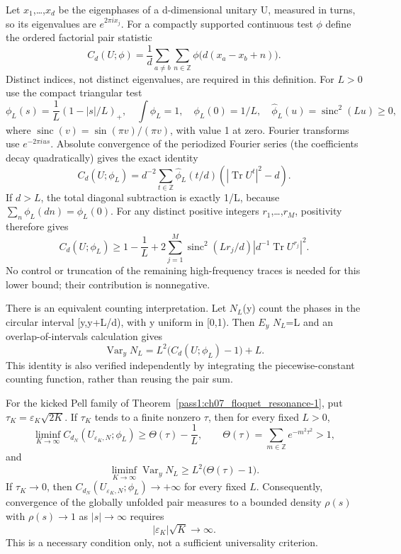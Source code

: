 Let \(x_{1}\),\ldots,\(x_{d}\) be the eigenphases of a d-dimensional unitary U, measured in turns, so its eigenvalues are \(e^{2\pi ix_j}\). For a compactly supported continuous test \(\phi\) define the ordered factorial pair statistic \[
 C_d(U;\phi)=\frac1d\sum_{a\ne b}\sum_{n\in\mathbb Z}
              \phi\bigl(d(x_a-x_b+n)\bigr).                    \tag{FN.23}
\] Distinct indices, not distinct eigenvalues, are required in this definition. For \(L>0\) use the compact triangular test \[
 \phi_L(s)=\frac1L(1-|s|/L)_+,\quad
 \int\phi_L=1,\quad \phi_L(0)=1/L,\quad
 \widehat\phi_L(u)=\operatorname{sinc}^2(Lu)\geq0,               \tag{FN.24}
\] where \(\operatorname{sinc}(v)=\sin(\pi v)/(\pi v)\), with value 1 at zero. Fourier transforms use \(e^{-2\pi ius}\). Absolute convergence of the periodized Fourier series (the coefficients decay quadratically) gives the exact identity \[
 C_d(U;\phi_L)=d^{-2}\sum_{t\in\mathbb Z}
   \widehat\phi_L(t/d)(|\operatorname{Tr}U^t|^2-d).              \tag{FN.25}
\] If \(d>L\), the total diagonal subtraction is exactly 1/L, because \(\sum_n\phi_L(dn)=\phi_L(0)\). For any distinct positive integers \(r_{1}\),\ldots,\(r_{M}\), positivity therefore gives \[
 C_d(U;\phi_L)\geq1-\frac1L+
   2\sum_{j=1}^M\operatorname{sinc}^2(Lr_j/d)
                   |d^{-1}\operatorname{Tr}U^{r_j}|^2.         \tag{FN.26}
\] No control or truncation of the remaining high-frequency traces is needed for this lower bound; their contribution is nonnegative.

There is an equivalent counting interpretation. Let \(N_{L}\)(y) count the phases in the circular interval {[}y,y+L/d), with y uniform in {[}0,1). Then \(E_{y}\) \(N_{L}\)=L and an overlap-of-intervals calculation gives \[
 \operatorname{Var}_y N_L
      =L^2\bigl(C_d(U;\phi_L)-1\bigr)+L.                       \tag{FN.27}
\] This identity is also verified independently by integrating the piecewise-constant counting function, rather than reusing the pair sum.

\begin{theorem}\label{pass1:ch07_floquet_resonance-5} For the kicked Pell family of Theorem~\ref{pass1:ch07_floquet_resonance-1}, put \(\tau_K=\varepsilon_K\sqrt{2K}\). If \(\tau_{K}\) tends to a finite nonzero \(\tau\), then for every fixed \(L>0\), \[
 \liminf_{K\to\infty} C_{d_N}(U_{\varepsilon_K,N};\phi_L)
      \geq \Theta(\tau)-\frac1L,\qquad
 \Theta(\tau)=\sum_{m\in\mathbb Z}e^{-m^2\tau^2}>1,             \tag{FN.28}
\] and \[
 \liminf_{K\to\infty}\operatorname{Var}_y N_L
      \geq L^2\bigl(\Theta(\tau)-1\bigr).                      \tag{FN.29}
\] If \(\tau_K\to0\), then \(C_{d_N}(U_{\varepsilon_K,N};\phi_L)\to+\infty\) for every fixed \(L\). Consequently, convergence of the globally unfolded pair measures to a bounded density \(\rho(s)\) with \(\rho(s)\to1\) as \(|s|\to\infty\) requires \[
             |\varepsilon_K|\sqrt K\longrightarrow\infty.     \tag{FN.30}
\] This is a necessary condition only, not a sufficient universality criterion.
\end{theorem}

